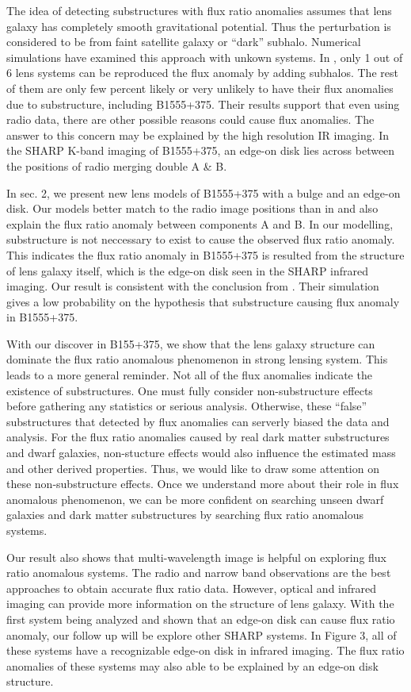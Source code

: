\documentclass[manuscript]{emulateapj}
\begin{document}
The idea of detecting substructures with flux ratio anomalies assumes that lens galaxy has completely smooth gravitational potential. Thus the perturbation is considered to be from faint satellite galaxy or ``dark'' subhalo. Numerical simulations have examined this approach with unkown systems. In \citet{Xu14}, only 1 out of 6 lens systems can be reproduced the flux anomaly by adding subhalos. The rest of them are only few percent likely or very unlikely to have their flux anomalies due to substructure, including B1555+375. Their results support that even using radio data, there are other possible reasons could cause flux anomalies. The answer to this concern may be explained by the high resolution IR imaging. In the SHARP K-band imaging of B1555+375, an edge-on disk lies across between the positions of radio merging double A \& B.

In sec. 2, we present new lens models of B1555+375 with a bulge and an edge-on disk. Our models better match to the radio image positions than in \citet{Marlow} and also explain the flux ratio anomaly between components A and B. In our modelling, substructure is not neccessary to exist to cause the observed flux ratio anomaly. This indicates the flux ratio anomaly in B1555+375 is resulted from the structure of lens galaxy itself, which is the edge-on disk seen in the SHARP infrared imaging. Our result is consistent with the conclusion from \citet{Xu14}. Their simulation gives a low probability on the hypothesis that substructure causing flux anomaly in B1555+375.

With our discover in B155+375, we show that the lens galaxy structure can dominate the flux ratio anomalous phenomenon in strong lensing system. This leads to a more general reminder. Not all of the flux anomalies indicate the existence of substructures. One must fully consider non-substructure effects before gathering any statistics or serious analysis. Otherwise, these ``false'' substructures that detected by flux anomalies can serverly biased the data and analysis. For the flux ratio anomalies caused by real dark matter substructures and dwarf galaxies, non-stucture effects would also influence the estimated mass and other derived properties. Thus, we would like to draw some attention on these non-substructure effects. Once we understand more about their role in flux anomalous phenomenon, we can be more confident on searching unseen dwarf galaxies and dark matter substructures by searching flux ratio anomalous systems.

Our result also shows that multi-wavelength image is helpful on exploring flux ratio anomalous systems. The radio and narrow band observations are the best approaches to obtain accurate flux ratio data. However, optical and infrared imaging can provide more information on the structure of lens galaxy. With the first system being analyzed and shown that an edge-on disk can cause flux ratio anomaly, our follow up will be explore other SHARP systems. In Figure 3, all of these systems have a recognizable edge-on disk in infrared imaging. The flux ratio anomalies of these systems may also able to be explained by an edge-on disk structure.\\
 
\end{document}
